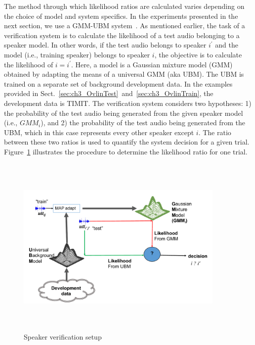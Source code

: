 The method through which likelihood ratios are calculated varies depending on the choice of model and system specifics. 
In the experiments presented in the next section, we use a GMM-UBM system~\cite{reynolds_map}. 
As mentioned earlier, the task of a verification system is to calculate the likelihood of a test audio belonging to a speaker model. 
In other words, if the test audio belongs to speaker $i^\prime$ and the model (i.e., training speaker) belongs to speaker $i$, the objective is to calculate the likelihood of $i=i^\prime$. 
Here, a model is a Gaussian mixture model (GMM) obtained by adapting the means of a universal GMM (aka UBM). 
The UBM is trained on a separate set of background development data. 
In the examples provided in Sect.~\ref{sec:ch3_OvlinTest}~and~\ref{sec:ch3_OvlinTrain}, the development data is TIMIT. 
The verification system considers two hypotheses: 1) the probability of the test audio being generated from the given speaker model (i.e., $GMM_i$), and 2) the probability of the test audio being generated from the UBM, which in this case represents every other speaker except $i$. 
The ratio between these two ratios is used to quantify the system decision for a given trial. 
Figure~\ref{fig:ch3_gmm_ubm_sid} illustrates the procedure to determine the likelihood ratio for one trial. 

\begin{figure}[h!]
	\centering
	\vspace{0mm}
	\includegraphics[height = 3.5in, width=0.9\textwidth]{figures/gmm_ubm_sid_setup}
	\vspace{-3mm}
	\caption{ Speaker verification setup}
	\label{fig:ch3_gmm_ubm_sid}
	\vspace{0mm}
\end{figure}

